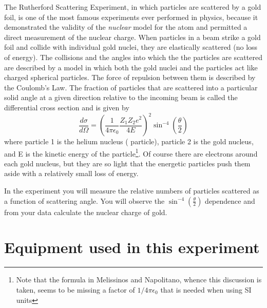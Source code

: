 \documentclass{../lab}
\begin{document}
The Rutherford Scattering Experiment, in which \textalpha{} particles are scattered by a gold foil, is one of the most famous experiments ever performed in physics, because it demonstrated the validity of the \emph{nuclear} model for the atom and permitted a direct measurement of the nuclear charge. When \textalpha{} particles in a beam strike a gold foil and collide with individual gold nuclei, they are elastically scattered (no loss of energy). The collisions and the angles into which the the \textalpha{} particles are scattered are described by a model in which both the gold nuclei and the \textalpha{} particles act like charged spherical particles. The force of repulsion between them is described by the Coulomb's Law. The fraction of particles that are scattered into a particular solid angle at a given direction relative to the incoming beam is called the differential cross section and is given by
\[
\frac{d\sigma}{d\Omega} = \left( \frac{1}{4 \pi \epsilon_0} \frac{Z_1 Z_2 e^2}{4E} \right)^2 \sin^{-4} \left(\frac{\theta}{2}\right)
\]
where particle 1 is the helium nucleus (\textalpha{} particle), particle 2 is the gold nucleus, and E is the kinetic energy of the \textalpha{} particle\footnote{Note that the formula in Melissinos and Napolitano, whence this discussion is taken, seems to be missing a factor of $1/4 \pi \epsilon_0$ that is needed when using SI units}. Of course there are electrons around each gold nucleus, but they are so light that the energetic \textalpha{} particles push them aside with a relatively small loss of energy.

In the experiment you will measure the relative numbers of \textalpha{} particles scattered as a function of scattering angle. You will observe the $\sin^{-4} \left(\frac{\theta}{2}\right)$ dependence and from your data calculate the nuclear charge of gold.

\section{Equipment used in this experiment}
\end{document}
